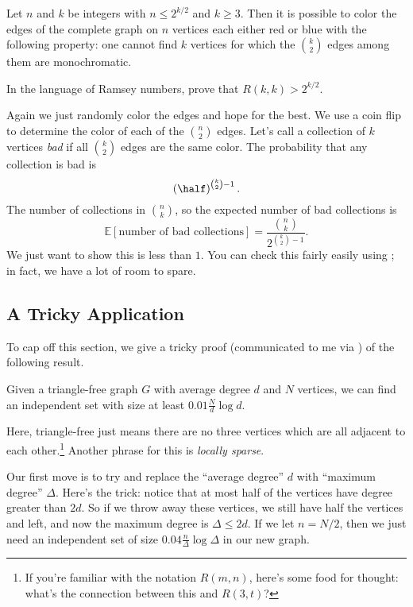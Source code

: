 \documentclass[11pt]{scrartcl}
\newcommand\EE{\mathbb E}
\begin{document}
\begin{example}
   Let $n$ and $k$ be integers with $n \le 2^{k/2}$ and $k \ge 3$.
  Then it is possible to color the edges of the complete graph on $n$ vertices
  each either red or blue with the following property:
  one cannot find $k$ vertices for which the $\binom k2$ edges among them
  are monochromatic.
\end{example}
\begin{remark*}
  In the language of Ramsey numbers, prove that $R(k,k) > 2^{k/2}$.
\end{remark*}
\begin{soln}
  Again we just randomly color the edges and hope for the best.
  We use a coin flip to determine the color of each of the $\binom n2$ edges.
  Let's call a collection of $k$ vertices \emph{bad} if all $\binom k2$ edges are the same color.
  The probability that any collection is bad is
  \[ \left( \half \right)^{\binom k2 - 1}. \]
  The number of collections in $\binom nk$, so the expected number of bad collections is
  \[ \EE[\text{number of bad collections}] = \frac{\binom nk}{2^{\binom k2 - 1}}. \]
  We just want to show this is less than $1$.
  You can check this fairly easily using ; in fact, we have a lot of room to spare.
\end{soln}

\subsection{A Tricky Application}
To cap off this section, we give a tricky proof (communicated to me via \cite{potalk})
of the following result.

\begin{theorem}
  Given a triangle-free graph $G$ with average degree $d$ and $N$ vertices,
  we can find an independent set with size at least $0.01 \frac{N}{d} \log d$.
\end{theorem}

Here, triangle-free just means there are no three vertices which are all adjacent to each other.\footnote{If you're familiar with the notation $R(m,n)$, here's some food for thought: what's the connection between this and $R(3,t)$?}
Another phrase for this is \emph{locally sparse}.

Our first move is to try and replace the ``average degree'' $d$ with ``maximum degree'' $\Delta$.
Here's the trick: notice that at most half of the vertices have degree greater than $2d$.
So if we throw away these vertices, we still have half the vertices and left, and now the maximum
degree is $\Delta \le 2d$.
If we let $n = N/2$, then we just need an independent set of size $0.04 \frac{n}{\Delta} \log \Delta$
in our new graph.
\end{document}
